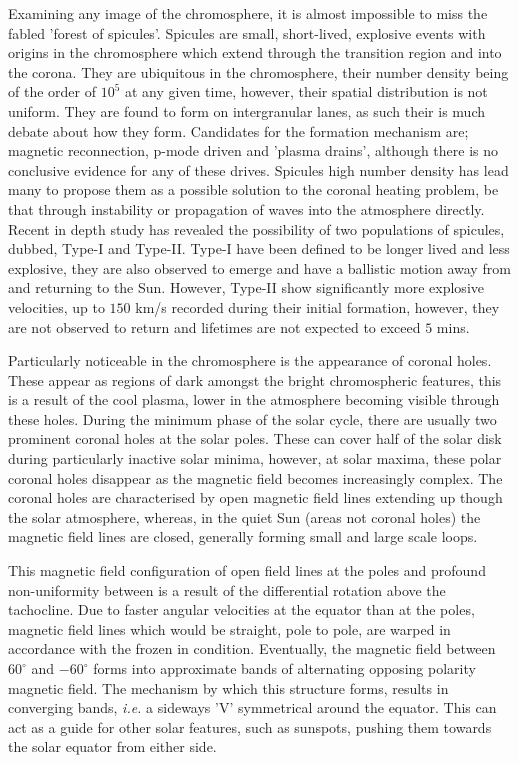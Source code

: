 Examining any image of the chromosphere, it is almost impossible to miss the fabled 'forest of spicules'.
Spicules are small, short-lived, explosive events with origins in the chromosphere which extend through the transition region and into the corona.
They are ubiquitous in the chromosphere, their number density being of the order of $10^5$ at any given time, however, their spatial distribution is not uniform.
They are found to form on intergranular lanes, as such their is much debate about how they form.
Candidates for the formation mechanism are; magnetic reconnection, p-mode driven and 'plasma drains', although there is no conclusive evidence for any of these drives.
Spicules high number density has lead many to propose them as a possible solution to the coronal heating problem, be that through instability or propagation of waves into the atmosphere directly.
Recent in depth study has revealed the possibility of two populations of spicules, dubbed, Type-I and Type-II.
Type-I have been defined to be longer lived and less explosive, they are also observed to emerge and have a ballistic motion away from and returning to the Sun.
However, Type-II show significantly more explosive velocities, up to $150$ km/s recorded during their initial formation, however, they are not observed to return and lifetimes are not expected to exceed $5$ mins. 

Particularly noticeable in the chromosphere is the appearance of coronal holes.
These appear as regions of dark amongst the bright chromospheric features, this is a result of the cool plasma, lower in the atmosphere becoming visible through these holes.
During the minimum phase of the solar cycle, there are usually two prominent coronal holes at the solar poles. 
These can cover half of the solar disk during particularly inactive solar minima, however, at solar maxima, these polar coronal holes disappear as the magnetic field becomes increasingly complex.
The coronal holes are characterised by open magnetic field lines extending up though the solar atmosphere, whereas, in the quiet Sun (areas not coronal holes) the magnetic field lines are closed, generally forming small and large scale loops.

This magnetic field configuration of open field lines at the poles and profound non-uniformity between is a result of the differential rotation above the tachocline.
Due to faster angular velocities at the equator than at the poles, magnetic field lines which would be straight, pole to pole, are warped in accordance with the frozen in condition.
Eventually, the magnetic field between $60^\circ$ and $-60^\circ$ forms into approximate bands of alternating opposing polarity magnetic field.
The mechanism by which this structure forms, results in converging bands, \emph{i.e.} a sideways 'V' symmetrical around the equator.
This can act as a guide for other solar features, such as sunspots, pushing them towards the solar equator from either side.

